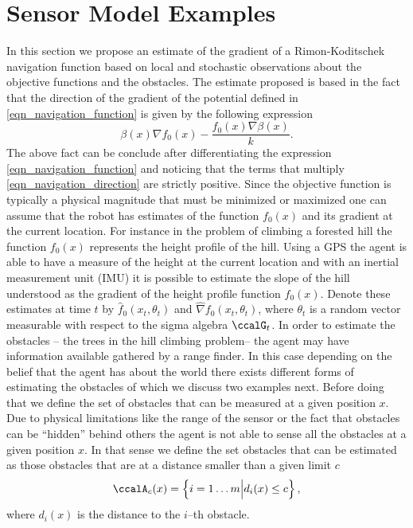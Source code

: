 \documentclass[article]{IEEEtran}
\theoremstyle{definition}
\begin{document}
\section{Sensor Model Examples}\label{sec_sensor_model}
%
In this section we propose an estimate of the gradient of a Rimon-Koditschek navigation function based on local and stochastic observations about the objective functions and the obstacles. The estimate proposed is based in the fact that the direction of the gradient of the potential defined in \eqref{eqn_navigation_function} is given by the following expression
%
\begin{equation}\label{eqn_navigation_direction}
\beta(x)\nabla f_0(x) - \frac{f_0(x) \nabla \beta(x)}{k}.
\end{equation}
%
The above fact can be conclude after differentiating the expression \eqref{eqn_navigation_function} and noticing that the terms that multiply \eqref{eqn_navigation_direction} are strictly positive. Since the objective function is typically a physical magnitude that must be minimized or maximized one can assume that the robot has estimates of the function $f_0(x)$ and its gradient at the current location. For instance in the problem of climbing a forested hill the function $f_0(x)$ represents the height profile of the hill. Using a GPS the agent is able to have a measure of the height at the current location and with an inertial measurement unit (IMU) it is possible to estimate the slope of the hill understood as the gradient of the height profile function $f_0(x)$. Denote these estimates at time $t$ by $\hat{f}_0(x_t,\theta_t)$ and $\hat{\nabla}f_0(x_t,\theta_t)$, where $\theta_t$ is a random vector measurable with respect to the sigma algebra $\ccalG_t$. In order to estimate the obstacles -- the trees in the hill climbing problem-- the agent may have information available gathered by a range finder. In this case depending on the belief that the agent has about the world there exists different forms of estimating the obstacles of which we discuss two examples next. Before doing that we define the set of obstacles that can be measured at a given position $x$. Due to physical limitations like the range of the sensor or the fact that obstacles can be ``hidden'' behind others the agent is not able to sense all the obstacles at a given position $x$. In that sense we define the set obstacles that can be estimated as those obstacles that are at a distance smaller than a given limit $c$
%
\begin{equation}\label{eqn_awareness_set}
\ccalA_c(x) = \left\{ i=1\ldots m \Big| d_i(x) \leq c\right\},
\end{equation}
where $d_i(x)$ is the distance to the $i$--th obstacle. 
%
\end{document}
